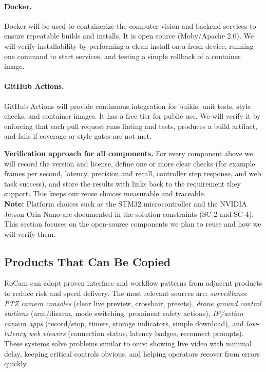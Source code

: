 \documentclass[12pt]{article}
\begin{document}
\paragraph{Docker.}
Docker will be used to containerize the computer vision and backend services to
ensure repeatable builds and installs. It is open source (Moby/Apache 2.0). We
will verify installability by performing a clean install on a fresh device,
running one command to start services, and testing a simple rollback of a
container image.

\paragraph{GitHub Actions.}
GitHub Actions will provide continuous integration for builds, unit tests,
style checks, and container images. It has a free tier for public use. We will
verify it by enforcing that each pull request runs linting and tests, produces
a build artifact, and fails if coverage or style gates are not met.

\medskip
\noindent\textbf{Verification approach for all components.}
For every component above we will record the version and license, define one or more clear checks (for example frames per second, latency, precision and recall, controller step response, and web task success), and store the results with links back to the requirement they support. This keeps our reuse choices measurable and traceable.\\

\noindent\textbf{Note:} Platform choices such as the STM32 microcontroller and the
NVIDIA Jetson Orin Nano are documented in the solution constraints (SC-2 and
SC-4). This section focuses on the open-source components we plan to reuse and
how we will verify them.


\subsection{Products That Can Be Copied}
\label{sec:products-that-can-be-copied}

RoCam can adopt proven interface and workflow patterns from adjacent products
to reduce risk and speed delivery. The most relevant sources are:
\textit{surveillance PTZ camera consoles} (clear live preview, crosshair,
presets), \textit{drone ground control stations} (arm/disarm, mode switching,
prominent safety actions), \textit{IP/action camera apps} (record/stop, timers,
storage indicators, simple download), and \textit{low-latency web viewers}
(connection status, latency badges, reconnect prompts). These systems solve
problems similar to ours: showing live video with minimal delay, keeping
critical controls obvious, and helping operators recover from errors quickly.
\end{document}
